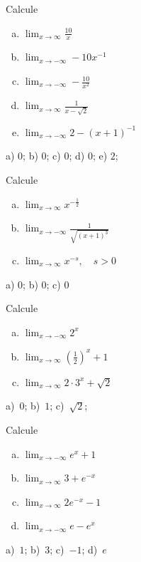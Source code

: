 \begin{exer}
  Calcule
  \begin{enumerate}[a)]
  \item $\displaystyle\lim_{x\to\infty} \frac{10}{x}$
  \item $\displaystyle\lim_{x\to -\infty} -10x^{-1}$
  \item $\displaystyle\lim_{x\to -\infty} -\frac{10}{x^2}$
  \item $\displaystyle\lim_{x\to\infty} \frac{1}{x-\sqrt{2}}$
  \item $\displaystyle\lim_{x\to -\infty} 2 - (x+1)^{-1}$
\end{enumerate}
\end{exer}
\begin{resp}
  a) $0$; b) $0$; c) $0$; d) $0$; e) $2$; 
\end{resp}

\begin{exer}
  Calcule
  \begin{enumerate}[a)]
  \item $\displaystyle\lim_{x\to\infty} x^{-\frac{1}{2}}$ 
  \item $\displaystyle\lim_{x\to -\infty} \frac{1}{\sqrt{(x+1)^3}}$ 
  \item $\displaystyle\lim_{x\to \infty} x^{-s},\quad s>0$ 
  \end{enumerate}
\end{exer}
\begin{resp}
  a) $0$; b) $0$; c) $0$
\end{resp}

\begin{exer}
  Calcule
  \begin{enumerate}[a)]
  \item $\displaystyle \lim_{x\to -\infty} 2^{x}$
  \item $\displaystyle \lim_{x\to \infty} \left(\frac{1}{2}\right)^x+1$
  \item $\displaystyle \lim_{x\to \infty} 2\cdot 3^x + \sqrt{2}$
  \end{enumerate}
\end{exer}
\begin{resp}
  a)~$0$; b)~$1$; c)~$\sqrt{2}$;
\end{resp}

\begin{exer}
  Calcule
  \begin{enumerate}[a)]
  \item $\displaystyle \lim_{x\to -\infty} e^x+1$
  \item $\displaystyle \lim_{x\to \infty} 3 + e^{-x}$
  \item $\displaystyle \lim_{x\to \infty} 2e^{-x}-1$
  \item $\displaystyle \lim_{x\to -\infty} e-e^{x}$
  \end{enumerate}
\end{exer}
\begin{resp}
  a)~$1$; b)~$3$; c)~$-1$; d)~$e$
\end{resp}


